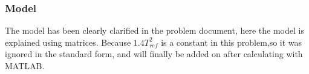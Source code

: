 \documentclass[titlepage,a4paper]{article}
\begin{document}

        \subsubsection{Model}

        The model has been clearly clarified in the problem document, here the model is explained using matrices. Because $1.4 T_{ref}^2$ is a constant in this problem,so it was ignored in the standard form, and will finally be added on after calculating with MATLAB.
\end{document}
